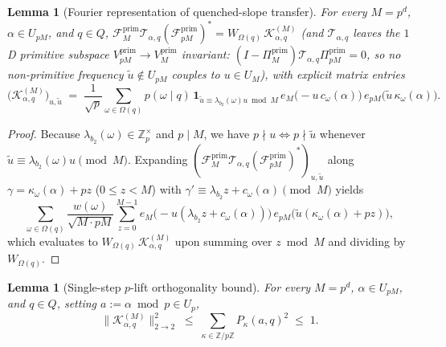 \documentclass[11pt,a4paper]{article}
\numberwithin{equation}{section}
\newtheorem{lemma}[theorem]{Lemma}
\theoremstyle{definition}
\theoremstyle{remark}
\newcommand{\Z}{\mathbb{Z}}
\newcommand{\cF}{\mathcal{F}}
\newcommand{\cT}{\mathcal{T}}
\newcommand{\cK}{\mathcal{K}}
\newcommand{\prim}{\mathrm{prim}}
\begin{document}
\begin{lemma}[Fourier representation of quenched-slope transfer]\label{lem:K_matrix}
For every $M = p^d$, $\alpha \in U_{pM}$, and $q \in Q$, $\cF_M^{\prim}\cT_{\alpha, q}(\cF_{pM}^{\prim})^* = W_{\Omega(q)}\,\cK_{\alpha, q}^{(M)}$ (and $\cT_{\alpha, q}$ leaves the $1$D primitive subspace $V_{pM}^{\prim} \to V_M^{\prim}$ invariant: $(I - \Pi_M^{\prim})\cT_{\alpha, q}\Pi_{pM}^{\prim} = 0$, so no non-primitive frequency $\tilde u \notin U_{pM}$ couples to $u \in U_M$), with explicit matrix entries
\[
\bigl(\cK_{\alpha, q}^{(M)}\bigr)_{u, \tilde u} \;=\; \frac{1}{\sqrt{p}} \sum_{\omega \in \Omega(q)} p(\omega \mid q)\,\mathbf{1}_{\tilde u \equiv \lambda_{b_2}(\omega)u \bmod M}\, e_M\bigl(-u\,c_\omega(\alpha)\bigr)\, e_{pM}\bigl(\tilde u\,\kappa_\omega(\alpha)\bigr).
\]
\end{lemma}

\begin{proof}
Because $\lambda_{b_2}(\omega) \in \Z_p^\times$ and $p \mid M$, we have $p \nmid u \iff p \nmid \tilde u$ whenever $\tilde u \equiv \lambda_{b_2}(\omega) u \pmod M$. Expanding $(\cF_M^{\prim}\cT_{\alpha, q}(\cF_{pM}^{\prim})^*)_{u, \tilde u}$ along $\gamma = \kappa_\omega(\alpha) + p z$ ($0 \le z < M$) with $\gamma' \equiv \lambda_{b_2} z + c_\omega(\alpha) \pmod M$ yields
\[
\sum_{\omega \in \Omega(q)} \frac{w(\omega)}{\sqrt{M\cdot pM}}\sum_{z=0}^{M-1} e_M\bigl(-u(\lambda_{b_2} z + c_\omega(\alpha))\bigr)\,e_{pM}\bigl(\tilde u(\kappa_\omega(\alpha) + p z)\bigr),
\]
which evaluates to $W_{\Omega(q)}\,\cK_{\alpha, q}^{(M)}$ upon summing over $z \bmod M$ and dividing by $W_{\Omega(q)}$.
\end{proof}

\begin{lemma}[Single-step $p$-lift orthogonality bound]\label{lem:K_single_step}
For every $M = p^d$, $\alpha \in U_{pM}$, and $q \in Q$, setting $a := \alpha \bmod p \in U_p$,
\[
\bigl\|\cK_{\alpha, q}^{(M)}\bigr\|_{2 \to 2}^2 \;\le\; \sum_{\kappa \in \Z/p\Z} P_\kappa(a, q)^2 \;\le\; 1.
\]
\end{lemma}
\end{document}
